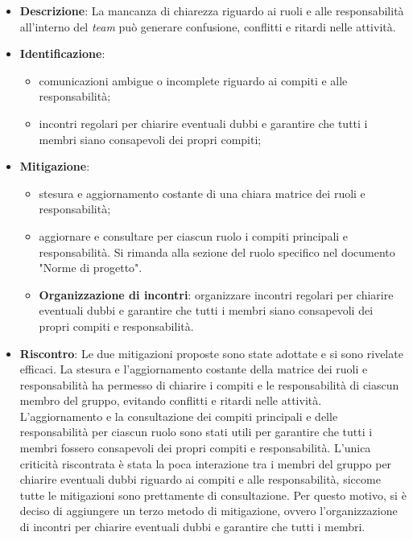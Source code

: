 \label{risk:mancanza di chiarezza nei ruoli e responsabilità}
\begin{itemize}
	\item \textbf{Descrizione}:
			La mancanza di chiarezza riguardo ai ruoli e alle responsabilità 
			all'interno del \textit{team} può generare confusione, conflitti e ritardi 
			nelle attività.

	\item \textbf{Identificazione}:
	      \begin{itemize}
		      \item comunicazioni ambigue o incomplete riguardo ai compiti e alle responsabilità;

		      \item incontri regolari per chiarire eventuali dubbi e garantire che tutti 
			  		i membri siano consapevoli dei propri compiti;
	      \end{itemize}

	\item \textbf{Mitigazione}:
	      \begin{itemize}
		      \item stesura e aggiornamento costante di una chiara matrice dei ruoli e responsabilità;

		      \item aggiornare e consultare per ciascun ruolo i compiti principali e responsabilità.
			  		Si rimanda alla sezione del ruolo specifico nel documento "Norme di progetto".
			\item \textbf{Organizzazione di incontri}: organizzare incontri regolari per chiarire eventuali dubbi e garantire che tutti i membri siano consapevoli 
					dei propri compiti e responsabilità.	
	      \end{itemize}

	\item \textbf{Riscontro}: Le due mitigazioni proposte sono state adottate e si sono rivelate efficaci. 
	La stesura e l'aggiornamento costante della matrice dei ruoli e responsabilità ha permesso di chiarire i compiti e le responsabilità di ciascun membro del gruppo, 
	evitando conflitti e ritardi nelle attività. L'aggiornamento e la consultazione dei compiti principali e delle responsabilità per ciascun 
	ruolo sono stati utili per garantire che tutti i membri fossero consapevoli dei propri compiti e responsabilità. L'unica criticità riscontrata è stata la poca 
	interazione tra i membri del gruppo per chiarire eventuali dubbi riguardo ai compiti e alle responsabilità, siccome tutte le mitigazioni sono prettamente di consultazione. 
	Per questo motivo, si è deciso di aggiungere un terzo metodo di mitigazione, ovvero l'organizzazione di incontri per chiarire eventuali dubbi e garantire che tutti i membri.
\end{itemize}
